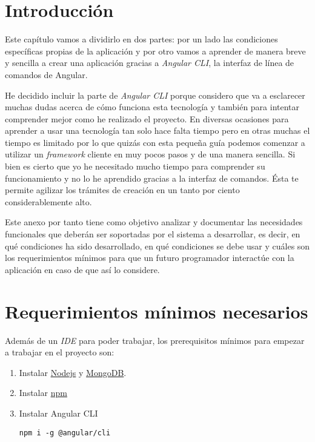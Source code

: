 
\section{Introducción}\label{introduccion-programador}
Este capítulo vamos a dividirlo en dos partes: por un lado las condiciones específicas propias de la aplicación y por otro vamos a aprender de manera breve y sencilla a crear una aplicación gracias a \emph{Angular CLI}, la interfaz de línea de comandos de Angular.

He decidido incluir la parte de \emph{Angular CLI}  porque considero que va a esclarecer muchas dudas acerca de cómo funciona esta tecnología y también para intentar comprender mejor como he realizado el proyecto. En diversas ocasiones para aprender a usar una tecnología tan solo hace falta tiempo pero en otras muchas el tiempo es limitado por lo que quizás con esta pequeña guía podemos comenzar a utilizar un \emph{framework} cliente en muy pocos pasos y de una manera sencilla. Si bien es cierto que yo he necesitado mucho tiempo para comprender su funcionamiento y no lo he aprendido gracias a la interfaz de comandos. Ésta te permite agilizar los trámites de creación en un tanto por ciento considerablemente alto.

Este anexo por tanto tiene como objetivo analizar y documentar las necesidades funcionales que deberán ser soportadas por el sistema a desarrollar, es decir, en qué condiciones ha sido desarrollado, en qué condiciones se debe usar y cuáles son los requerimientos mínimos para que un futuro programador interactúe con la aplicación en caso de que así lo considere.

\section{Requerimientos mínimos necesarios}
Además de un \emph{IDE} \cite{ides} para poder trabajar, los prerequisitos mínimos para empezar a trabajar en el proyecto son:

\begin{enumerate}
	\item Instalar \href{https://nodejs.org/en/}{Nodejs} y \href{https://www.mongodb.com/}{MongoDB}.
	\item Instalar \href{https://www.npmjs.com/}{npm}
	\item Instalar Angular CLI
		\lstset{language=C, breaklines=true, basicstyle=\footnotesize}
		\begin{lstlisting}[frame=single]
		npm i -g @angular/cli
    	\end{lstlisting}
\end{enumerate}

